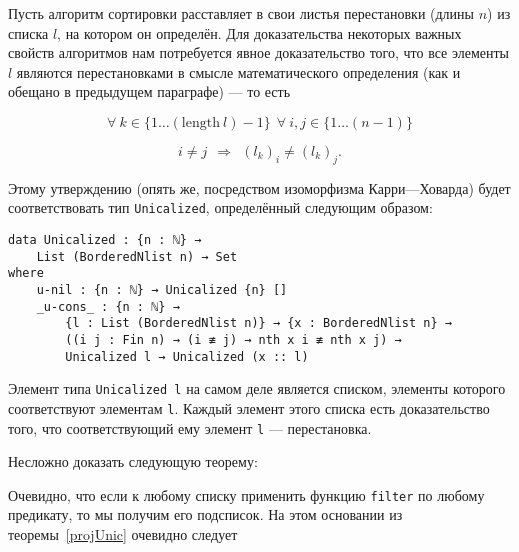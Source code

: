 

\abz Пусть алгоритм сортировки расставляет в свои листья перестановки (длины $n$) из списка $l$, на котором он определён. Для доказательства некоторых важных свойств алгоритмов нам потребуется явное доказательство того, что все элементы $l$ являются перестановками в смысле математического определения (как и обещано в предыдущем параграфе) — то есть

$$\forall~ k \in \{1 \ldots (\mathrm{length}\ l) - 1\}
\ \ \forall~ i,j \in \{1 \ldots (n-1)\}$$

\vspace{-0.4cm}
$$i \ne j \ \ \Longrightarrow
\ \ (l_k)_i \ne (l_k)_j.$$

\abz Этому утверждению (опять же, посредством изоморфизма Карри—Ховарда) будет соответствовать тип {\tt Unicalized}, определённый следующим образом:

\begin{verbatim}
data Unicalized : {n : ℕ} →
    List (BorderedNlist n) → Set
where
    u-nil : {n : ℕ} → Unicalized {n} []
    _u-cons_ : {n : ℕ} →
        {l : List (BorderedNlist n)} → {x : BorderedNlist n} →
        ((i j : Fin n) → (i ≢ j) → nth x i ≢ nth x j) →
        Unicalized l → Unicalized (x :: l)
\end{verbatim}

\abz Элемент типа {\tt Unicalized l} на самом деле является списком, элементы которого соответствуют элементам {\tt l}. Каждый элемент этого списка есть доказательство того, что соответствующий ему элемент {\tt l} — перестановка.

\abz Несложно доказать следующую теорему:


Очевидно, что если к любому списку применить функцию {\tt filter} по любому предикату, то мы получим его подсписок. На этом основании из теоремы~\ref{projUnic} очевидно следует


